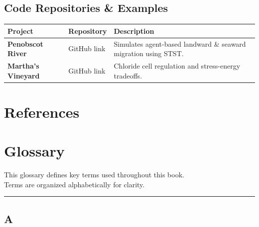 \documentclass[
]{book}
\begin{document}
\section{Code Repositories \& Examples}\label{code-repositories-examples}

\begin{longtable}[]{@{}
  >{\raggedright\arraybackslash}p{}
  >{\raggedright\arraybackslash}p{}
  >{\raggedright\arraybackslash}p{}@{}}
\toprule\noalign{}
\begin{minipage}[b]{\linewidth}\raggedright
Project
\end{minipage} & \begin{minipage}[b]{\linewidth}\raggedright
Repository
\end{minipage} & \begin{minipage}[b]{\linewidth}\raggedright
Description
\end{minipage} \\
\midrule\noalign{}
\endhead
\bottomrule\noalign{}
\endlastfoot
\textbf{Penobscot River} & GitHub link & Simulates agent-based landward \& seaward migration using STST. \\
\textbf{Martha's Vineyard} & GitHub link & Chloride cell regulation and stress-energy tradeoffs. \\
\end{longtable}

\chapter*{References}\label{references}

\chapter*{Glossary}\label{glossary}

This glossary defines key terms used throughout this book.\\
Terms are organized alphabetically for clarity.

\begin{center}\rule{0.5\linewidth}{0.5pt}\end{center}

\section*{A}\label{a}
\end{document}
